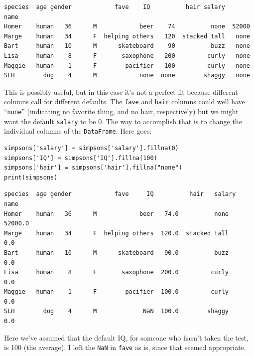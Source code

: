 \begin{Verbatim}[fontsize=\CBCodeSmall,samepage=true,frame=leftline,framesep=5mm,framerule=1mm]
       species  age gender            fave    IQ          hair salary
name                                                                 
Homer    human   36      M            beer    74          none  52000
Marge    human   34      F  helping others   120  stacked tall   none
Bart     human   10      M      skateboard    90          buzz   none
Lisa     human    8      F       saxophone   200         curly   none
Maggie   human    1      F        pacifier   100         curly   none
SLH        dog    4      M            none  none        shaggy   none
\end{Verbatim}

This is possibly useful, but in this case it's not a perfect fit because
different columns call for different defaults. The \texttt{fave} and
\texttt{hair} columns could well have ``\texttt{none}'' (indicating no
favorite thing, and no hair, respectively) but we might want the default
\texttt{salary} to be 0. The way to accomplish that is to change the individual
columns of the \texttt{DataFrame}. Here goes:

\begin{Verbatim}[fontsize=\small,samepage=true,frame=single,framesep=3mm]
simpsons['salary'] = simpsons['salary'].fillna(0)
simpsons['IQ'] = simpsons['IQ'].fillna(100)
simpsons['hair'] = simpsons['hair'].fillna("none")
print(simpsons)
\end{Verbatim}
\vspace{-.2in}

\label{finalSimpsons}

\begin{Verbatim}[fontsize=\CBCodeSmall,samepage=true,frame=leftline,framesep=5mm,framerule=1mm]
       species  age gender            fave     IQ          hair   salary
name                                                                    
Homer    human   36      M            beer   74.0          none  52000.0
Marge    human   34      F  helping others  120.0  stacked tall      0.0
Bart     human   10      M      skateboard   90.0          buzz      0.0
Lisa     human    8      F       saxophone  200.0         curly      0.0
Maggie   human    1      F        pacifier  100.0         curly      0.0
SLH        dog    4      M             NaN  100.0        shaggy      0.0
\end{Verbatim}

Here we've assumed that the default IQ, for someone who hasn't taken the test,
is 100 (the average). I left the \texttt{NaN} in \texttt{fave} as is, since
that seemed appropriate.

